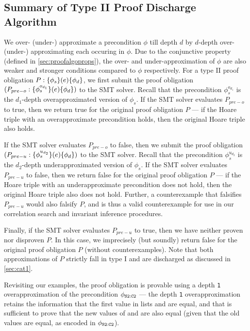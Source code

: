 \subsection{Summary of Type II Proof Discharge Algorithm}
\label{sec:cat2summary}
We over- (under-) approximate a precondition $\phi$ till depth $d$ by $d$-depth over- (under-) approximating
each \recursiveRelation{} occuring in $\phi$.
Due to the conjunctive \recursiveRelation{} property (defined in \cref{sec:proofalgoprops}),
the over- and under-approximation of $\phi$ are also weaker and stronger conditions compared to $\phi$
respectively.
For a type II proof obligation $P: \{\phi_s\}(e)\{\phi_d\}$, we first
submit the proof obligation $(P_{pre-o}: \{\phi^{o_{d_1}}_s\}(e)\{\phi_d\})$
to the SMT solver. Recall that the precondition $\phi^{o_{d_1}}_s$
is the $d_1$-depth overapproximated version of $\phi_s$.
If the SMT solver evaluates $P_{{pre-o}}$ to true, then we return true for
the original proof obligation $P$ --- if the
Hoare triple with an overapproximate precondition
holds, then the original Hoare triple
also holds.

If the SMT solver evaluates $P_{pre-o}$ to false, then we submit
the proof obligation $(P_{pre-u}: \{\phi^{u_{d_2}}_s\}(e)\{\phi_d\})$
to the SMT solver. Recall that the precondition $\phi^{u_{d_2}}_s$
is the $d_2$-depth underapproximated version of $\phi_s$.
If the SMT solver evaluates $P_{pre-u}$ to false, then we return false for
the original proof obligation $P$ --- if the
Hoare triple with an underapproximate precondition
does not hold, then the original Hoare triple
also does not hold. Further, a counterexample that
falsifies $P_{pre-u}$ would also falsify $P$,
and is thus a valid counterexample for use in our correlation search and invariant inference procedures.

Finally, if the SMT solver evaluates $P_{pre-u}$ to true, then we have neither
proven nor disproven $P$.
In this case, we imprecisely (but soundly) return false for the
original proof obligation $P$ (without counterexamples).
Note that both approximations of $P$ strictly fall in type I and are
discharged as discussed in \cref{sec:cat1}.

Revisiting our examples, the proof obligation 
is provable using a depth {\tt 1} overapproximation of the
precondition $\phi_{{\tt S2:C2}}$ --- the depth {\tt 1} overapproximation retains the
information that the first value in lists  and 
are equal, and that is sufficient to prove that
the new values of  and  are also equal
(given that the old values are equal, as encoded in $\phi_{{\tt S2:C2}}$).

